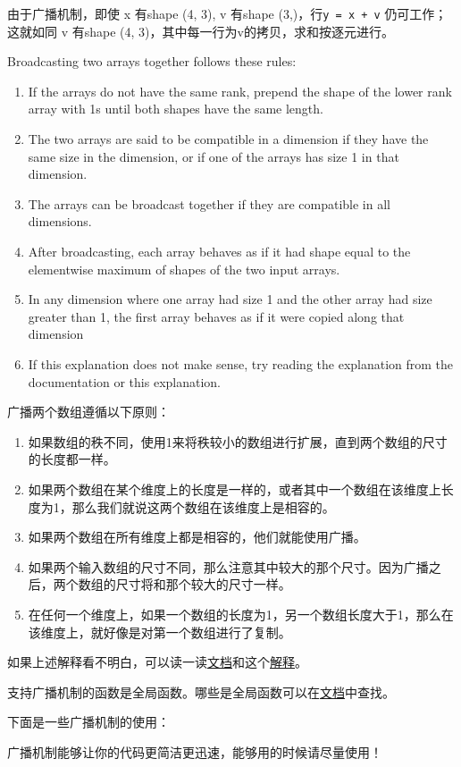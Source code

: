 由于广播机制，即使 x 有shape (4, 3), v 有shape (3,)，行\lstinline|y = x + v| 仍可工作； 这就如同 v 有shape (4, 3)，其中每一行为v的拷贝，求和按逐元进行。



Broadcasting two arrays together follows these rules:
\begin{enumerate}
\item If the arrays do not have the same rank, prepend the shape of the lower rank array with 1s until both shapes have the same length.
\item The two arrays are said to be compatible in a dimension if they have the same size in the dimension, or if one of the arrays has size 1 in that dimension.
\item The arrays can be broadcast together if they are compatible in all dimensions.
\item After broadcasting, each array behaves as if it had shape equal to the elementwise maximum of shapes of the two input arrays.
\item In any dimension where one array had size 1 and the other array had size greater than 1, the first array behaves as if it were copied along that dimension
\item If this explanation does not make sense, try reading the explanation from the documentation or this explanation.
\end{enumerate}

广播两个数组遵循以下原则：
\begin{enumerate}
\item 如果数组的秩不同，使用1来将秩较小的数组进行扩展，直到两个数组的尺寸的长度都一样。
\item 如果两个数组在某个维度上的长度是一样的，或者其中一个数组在该维度上长度为1，那么我们就说这两个数组在该维度上是相容的。
\item 如果两个数组在所有维度上都是相容的，他们就能使用广播。
\item 如果两个输入数组的尺寸不同，那么注意其中较大的那个尺寸。因为广播之后，两个数组的尺寸将和那个较大的尺寸一样。
\item 在任何一个维度上，如果一个数组的长度为1，另一个数组长度大于1，那么在该维度上，就好像是对第一个数组进行了复制。
\end{enumerate}

如果上述解释看不明白，可以读一读\href{http://docs.scipy.org/doc/numpy/user/basics.broadcasting.html}{文档}和这个\href{http://wiki.scipy.org/EricsBroadcastingDoc}{解释}。
%

支持广播机制的函数是全局函数。哪些是全局函数可以在\href{http://docs.scipy.org/doc/numpy/reference/ufuncs.html#available-ufuncs}{文档}中查找。

下面是一些广播机制的使用：




广播机制能够让你的代码更简洁更迅速，能够用的时候请尽量使用！
